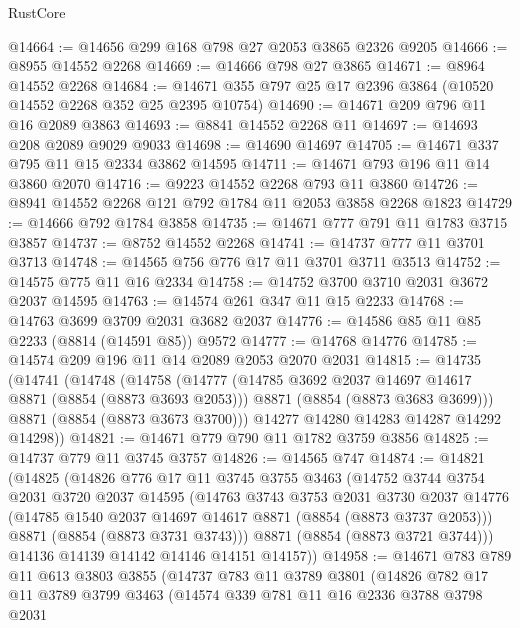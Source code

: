 \begin{lexlean}{RustCore}
\begin{coremodule}
@14664 := @14656 @299 @168 @798 @27 @2053 @3865 @2326 @9205
@14666 := @8955 @14552 @2268
@14669 := @14666 @798 @27 @3865
@14671 := @8964 @14552 @2268
@14684 := @14671 @355 @797 @25 @17 @2396 @3864 (@10520 @14552 @2268 @352 @25 @2395 @10754)
@14690 := @14671 @209 @796 @11 @16 @2089 @3863
@14693 := @8841 @14552 @2268 @11
@14697 := @14693 @208 @2089 @9029 @9033
@14698 := @14690 @14697
@14705 := @14671 @337 @795 @11 @15 @2334 @3862 @14595
@14711 := @14671 @793 @196 @11 @14 @3860 @2070
@14716 := @9223 @14552 @2268 @793 @11 @3860
@14726 := @8941 @14552 @2268 @121 @792 @1784 @11 @2053 @3858 @2268 @1823
@14729 := @14666 @792 @1784 @3858
@14735 := @14671 @777 @791 @11 @1783 @3715 @3857
@14737 := @8752 @14552 @2268
@14741 := @14737 @777 @11 @3701 @3713
@14748 := @14565 @756 @776 @17 @11 @3701 @3711 @3513
@14752 := @14575 @775 @11 @16 @2334
@14758 := @14752 @3700 @3710 @2031 @3672 @2037 @14595
@14763 := @14574 @261 @347 @11 @15 @2233
@14768 := @14763 @3699 @3709 @2031 @3682 @2037
@14776 := @14586 @85 @11 @85 @2233 (@8814 (@14591 @85)) @9572
@14777 := @14768 @14776
@14785 := @14574 @209 @196 @11 @14 @2089 @2053 @2070 @2031
@14815 := @14735
    (@14741
      (@14748
        (@14758
          (@14777
            (@14785 @3692 @2037 @14697 @14617 @8871 (@8854 (@8873 @3693 @2053)))
            @8871
            (@8854 (@8873 @3683 @3699)))
          @8871
          (@8854 (@8873 @3673 @3700)))
        @14277
        @14280
        @14283
        @14287
        @14292
        @14298))
@14821 := @14671 @779 @790 @11 @1782 @3759 @3856
@14825 := @14737 @779 @11 @3745 @3757
@14826 := @14565 @747
@14874 := @14821
    (@14825
      (@14826
        @776
        @17
        @11
        @3745
        @3755
        @3463
        (@14752
          @3744
          @3754
          @2031
          @3720
          @2037
          @14595
          (@14763
            @3743
            @3753
            @2031
            @3730
            @2037
            @14776
            (@14785 @1540 @2037 @14697 @14617 @8871 (@8854 (@8873 @3737 @2053)))
            @8871
            (@8854 (@8873 @3731 @3743)))
          @8871
          (@8854 (@8873 @3721 @3744)))
        @14136
        @14139
        @14142
        @14146
        @14151
        @14157))
@14958 := @14671
    @783
    @789
    @11
    @613
    @3803
    @3855
    (@14737
      @783
      @11
      @3789
      @3801
      (@14826
        @782
        @17
        @11
        @3789
        @3799
        @3463
        (@14574
          @339
          @781
          @11
          @16
          @2336
          @3788
          @3798
          @2031

\end{coremodule}
\end{lexlean}
